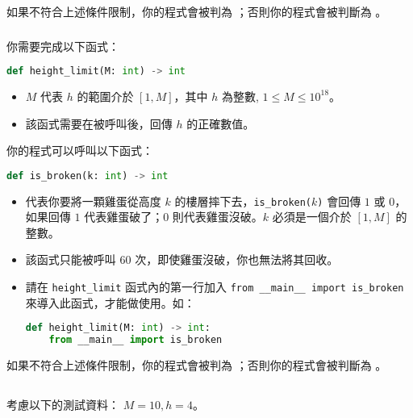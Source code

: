 如果不符合上述條件限制，你的程式會被判為 ；否則你的程式會被判斷為 。

\subsubsection*{}

你需要完成以下函式：

\begin{lstlisting}[language = python]
def height_limit(M: int) -> int
\end{lstlisting}

\begin{itemize}
    \item $M$ 代表 $h$ 的範圍介於 $[1,M]$，其中 $h$ 為整數, $1\le M\le 10^{18}$。
    \item 該函式需要在被呼叫後，回傳 $h$ 的正確數值。
\end{itemize}

你的程式可以呼叫以下函式：

\begin{lstlisting}[language = python]
def is_broken(k: int) -> int
\end{lstlisting}

\begin{itemize}
    \item 代表你要將一顆雞蛋從高度 $k$ 的樓層摔下去，\texttt{is\_broken($k$)} 會回傳 $1$ 或 $0$，如果回傳 $1$ 代表雞蛋破了；$0$ 則代表雞蛋沒破。$k$ 必須是一個介於 $[1,M]$ 的整數。
    \item 該函式只能被呼叫 $60$ 次，即使雞蛋沒破，你也無法將其回收。
    \item 請在 \texttt{height\_limit} 函式內的第一行加入 \texttt{from \_\_main\_\_ import is\_broken} 來導入此函式，才能做使用。如：

\begin{lstlisting}[language = python]
def height_limit(M: int) -> int:
    from __main__ import is_broken
\end{lstlisting}
\end{itemize}

如果不符合上述條件限制，你的程式會被判為 ；否則你的程式會被判斷為 。

\subsection*{}

考慮以下的測試資料： $M=10, h=4$。

